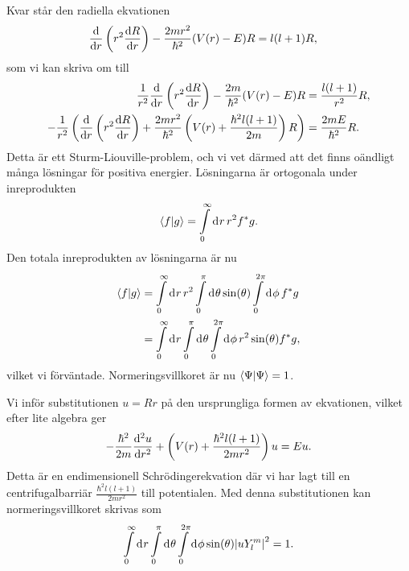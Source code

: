 Kvar står den radiella ekvationen
\begin{align*}
	\dv{r}\left(r^{2}\dv{R}{r}\right) - \frac{2mr^{2}}{\hbar^{2}}(V(r) - E)R &= l(l + 1)R,
\end{align*}
som vi kan skriva om till
\begin{align*}
	\frac{1}{r^{2}}\dv{r}\left(r^{2}\dv{R}{r}\right) - \frac{2m}{\hbar^{2}}(V(r) - E)R &= \frac{l(l + 1)}{r^{2}}R, \\
	-\frac{1}{r^{2}}\left(\dv{r}\left(r^{2}\dv{R}{r}\right) + \frac{2mr^{2}}{\hbar^{2}}\left(V(r) + \frac{\hbar^{2}l(l + 1)}{2m}\right)R\right) &= \frac{2mE}{\hbar^{2}}R.
\end{align*}
Detta är ett Sturm-Liouville-problem, och vi vet därmed att det finns oändligt många lösningar för positiva energier. Lösningarna är ortogonala under inreprodukten
\begin{align*}
	\braket{f}{g} = \int\limits_{0}^{\infty}\dd[]{r}r^{2}f^{*}g.
\end{align*}
Den totala inreprodukten av lösningarna är nu
\begin{align*}
	\braket{f}{g} &= \int\limits_{0}^{\infty}\dd[]{r}r^{2}\int\limits_{0}^{\pi}\dd[]{\theta}\sin(\theta)\int\limits_{0}^{2\pi}\dd[]{\phi}f^{*}g \\
	              &= \int\limits_{0}^{\infty}\dd[]{r}\int\limits_{0}^{\pi}\dd[]{\theta}\int\limits_{0}^{2\pi}\dd[]{\phi}r^{2}\sin(\theta)f^{*}g,
\end{align*}
vilket vi förväntade. Normeringsvillkoret är nu $\braket{\Psi} = 1$.

Vi inför substitutionen $u = Rr$ på den ursprungliga formen av ekvationen, vilket efter lite algebra ger
\begin{align*}
	-\frac{\hbar^{2}}{2m}\dv[2]{u}{r} + \left(V(r) + \frac{\hbar^{2}l(l + 1)}{2mr^{2}}\right)u = Eu.
\end{align*}
Detta är en endimensionell Schrödingerekvation där vi har lagt till en centrifugalbarriär $\frac{\hbar^{2}l(l + 1)}{2mr^{2}}$ till potentialen. Med denna substitutionen kan normeringsvillkoret skrivas som
\begin{align*}
	\int\limits_{0}^{\infty}\dd[]{r}\int\limits_{0}^{\pi}\dd[]{\theta}\int\limits_{0}^{2\pi}\dd[]{\phi}\sin(\theta)\abs{uY_{l}^{m}}^{2} = 1.
\end{align*}

